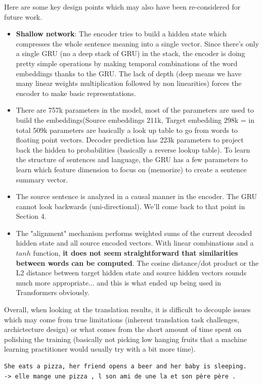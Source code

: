 \documentclass[a4paper]{article}
\begin{document}
Here are some key design points which may also have been re-considered for future work.
\begin{itemize}
\item \textbf{Shallow network}: The encoder tries to build a hidden state which compresses the whole sentence meaning into a single vector. Since there's only a single GRU (no a deep stack of GRU) in the stack, the encoder is doing pretty simple operations by making temporal combinations of the word embeddings thanks to the GRU. The lack of depth (deep means we have many linear weights multiplication followed by non linearities) forces the encoder to make basic representations.
\item There are 757k parameters in the model, most of the parameters are used to build the embeddings(Source embeddings  211k, 
Target embedding  298k = in total 509k parameters are basically a look up table to go from words to floating point vectors. Decoder prediction  has 223k parameters to project back the hidden to probabilities (basically a reverse lookup table). To learn the structure of sentences and language, the GRU has a few parameters to learn which feature dimension to focus on (memorize) to create a sentence summary vector.
\item The source sentence is analyzed in a causal manner in the encoder. The GRU cannot look backwards (uni-directional). We'll come back to that point in Section 4.
\item The "alignment" mechanism performs weighted sums of the current decoded hidden state and all source encoded vectors. With linear combinations and a $tanh$ function, \textbf{it does not seem straightforward that similarities between words can be computed}. The cosine distance/dot product or the L2 distance between target hidden state and source hidden vectors sounds much more appropriate... and this is what ended up being used in Transformers\cite{vaswani2017attention_transformer} obviously.
\end{itemize}



Overall, when looking at the translation results, it is difficult to decouple issues which may come from true limitations (inherent translation task challenges, archictecture design) or what comes from the short amount of time spent on polishing the training (basically not picking low hanging fruits that a machine learning practitioner would usually try with a bit more time).


\begin{verbatim}
She eats a pizza, her friend opens a beer and her baby is sleeping. 
-> elle mange une pizza , l son ami de une la et son père père .
\end{verbatim}
\end{document}
